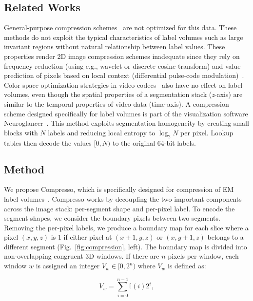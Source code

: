 \subsection{Related Works}

General-purpose compression schemes~\cite{collet2016smaller,deutsch1996zlib,google2016brotli,lehmann2016liblzf,oberhumer2005lzo,pavlov2007lzma,seward1998bzip2,vandevenne2016zopfli,welch1984technique,ziv1978compression} are not optimized for this data.
These methods do not exploit the typical characteristics of label volumes such as large invariant regions without natural relationship between label values. 
These properties render 2D image compression schemes inadequate since they rely on frequency reduction (using e.g., wavelet or discrete cosine transform) and value prediction of pixels based on local context (differential pulse-code modulation)~\cite{roelofs1999png,skodras2001jpeg}. 
Color space optimization strategies in video codecs~\cite{aimar2005x264} also have no effect on label volumes, even though the spatial properties of a segmentation stack (\textit{z}-axis) are similar to the temporal properties of video data (time-axis). 
A compression scheme designed specifically for label volumes is part of the visualization software Neuroglancer~\cite{google2016compressed}. 
This method exploits segmentation homogeneity by creating small blocks with $N$ labels and reducing local entropy to $\log_2{N}$ per pixel. 
Lookup tables then decode the values $[0,N)$ to the original 64-bit labels.

\subsection{Method}

We propose Compresso, which is specifically designed for compression of EM label volumes~\cite{matejek2017compresso}.
Compresso works by decoupling the two important components across the image stack: per-segment shape and per-pixel label.
To encode the segment shapes, we consider the boundary pixels between two segments. 
Removing the per-pixel labels, we produce a boundary map for each slice where a pixel $(x, y, z)$ is 1 if either pixel at $(x + 1, y, z)$ or $(x, y + 1, z)$ belongs to a different segment (Fig.~\ref{fig:compression}, left). 
The boundary map is divided into non-overlapping congruent 3D windows. If there are $n$ pixels per window, each window $w$ is assigned an integer $V_w \in [0, 2^n)$ where $V_w$ is defined as:

\begin{equation}
V_w = \sum_{i = 0}^{n - 1} \mathbb{I}(i) 2^i,
\end{equation}

